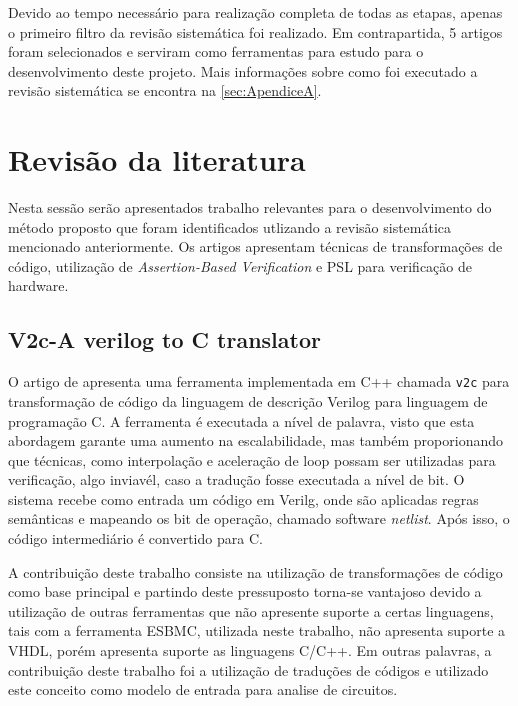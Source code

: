 \par
Devido ao tempo necessário para realização completa de todas as etapas, apenas o primeiro filtro da revisão sistemática foi realizado. Em contrapartida, 5 artigos foram selecionados e serviram como ferramentas para estudo para o desenvolvimento deste projeto. Mais informações sobre como foi executado a revisão sistemática se encontra na \autoref{sec:ApendiceA}.
\section{Revisão da literatura}
Nesta sessão serão apresentados trabalho relevantes para o desenvolvimento do método proposto que foram identificados utlizando a revisão sistemática mencionado anteriormente. Os artigos apresentam técnicas de transformações de código, utilização de \textit{Assertion-Based Verification} e PSL para verificação de hardware.

\subsection{V2c-A verilog to C translator}

O artigo de \citeauthor{mukherjee2016v2c} apresenta uma ferramenta implementada em C++ chamada \texttt{v2c} para transformação de código da linguagem de descrição Verilog para linguagem de programação C. A ferramenta é executada a nível de palavra, visto que esta abordagem garante uma aumento na escalabilidade, mas também proporionando que técnicas, como interpolação e aceleração de loop possam ser utilizadas para verificação, algo inviavél, caso a tradução fosse executada a nível de bit. O sistema recebe como entrada um código em Verilg, onde são aplicadas regras semânticas e mapeando os bit de operação, chamado software \textit{netlist}. Após isso, o código intermediário é convertido para C.

\par
A contribuição deste trabalho consiste na utilização de transformações de código como base principal e partindo deste pressuposto torna-se vantajoso devido a utilização de outras ferramentas que não apresente suporte a certas linguagens, tais com a ferramenta ESBMC, utilizada neste trabalho, não apresenta suporte a VHDL, porém apresenta suporte as linguagens C/C++. Em outras palavras, a contribuição deste trabalho foi a utilização de traduções de códigos e utilizado este conceito como modelo de entrada para analise de circuitos.

